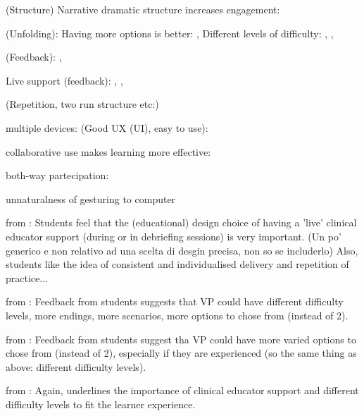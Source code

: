 
(Structure) Narrative dramatic structure increases engagement: \cite{marei2018use}

(Unfolding): Having more options is better: \cite{dupuy2019virtual}, \cite{peddle2019development}
Different levels of difficulty: \cite{dupuy2019virtual}, \cite{peddle2019development}, \cite{peddle2019exploring}

(Feedback): \cite{jacklin2018improving}, \cite{quail2016student}

Live support (feedback): \cite{quail2016student}, \cite{peddle2019exploring}, \cite{adefila2020students}

(Repetition, two run structure etc:) \cite{quail2016student} \cite{kron2017using}

multiple devices: \cite{richardson2019virtual}
(Good UX (UI), easy to use): \cite{peddle2019exploring}




collaborative use makes learning more effective: \cite{marei2018use} \cite{zielke2016beyond}

both-way partecipation: \cite{schoenthaler2017simulated}

unnaturalness of gesturing to computer \cite{guetterman2019medical}



from \cite{quail2016student}: Students feel that the (educational) design choice of having a 'live' clinical educator support (during or in debriefing sessions) is very important. (Un po' generico e non relativo ad una scelta di desgin precisa, non so se includerlo) Also, students like the idea of consistent and individualised delivery and repetition of practice...

from \cite{dupuy2019virtual}: Feedback from students suggests that VP could have different difficulty levels, more endings, more scenarios, more options to chose from (instead of 2).

from \cite{peddle2019development}: Feedback from students suggest tha VP could have more varied options to chose from (instead of 2), especially if they are experienced (so the same thing as above: different difficulty levels).  

from \cite{peddle2019exploring}: Again, underlines the importance of clinical educator support and different difficulty levels to fit the learner experience.

